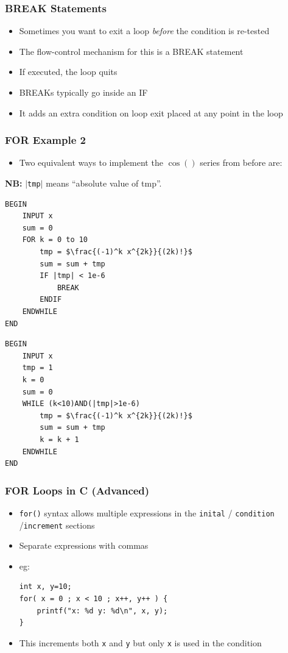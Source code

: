 \documentclass[14pt]{beamer}
\begin{document}
\begin{frame}
\frametitle{BREAK Statements}
\begin{itemize}
\item Sometimes you want to exit a loop \textit{before} the condition is re-tested
\item The flow-control mechanism for this is a BREAK statement
\item If executed, the loop quits
\item BREAKs typically go inside an IF
\item It adds an extra condition on loop exit placed at any point in the loop
\end{itemize}
\end{frame}

\begin{frame}[fragile]
\frametitle{FOR Example 2}
\begin{itemize}
\item Two equivalent ways to implement the $\cos()$ series from before are:
\end{itemize}
{\small\textbf{NB:} $|$\texttt{tmp}$|$ means ``absolute value of tmp''.}
\begin{multicols}{2}
\begin{lstlisting}[style=pseudo,mathescape=true,basicstyle=\ttfamily\scriptsize]
BEGIN
	INPUT x
	sum = 0
	FOR k = 0 to 10
		tmp = $\frac{(-1)^k x^{2k}}{(2k)!}$
		sum = sum + tmp
		IF |tmp| < 1e-6
			BREAK
		ENDIF
	ENDWHILE 
END
\end{lstlisting}
\columnbreak
\begin{lstlisting}[style=pseudo,mathescape=true,basicstyle=\ttfamily\scriptsize]
BEGIN
	INPUT x
	tmp = 1
	k = 0
	sum = 0
	WHILE (k<10)AND(|tmp|>1e-6)
		tmp = $\frac{(-1)^k x^{2k}}{(2k)!}$
		sum = sum + tmp
		k = k + 1
	ENDWHILE 
END
\end{lstlisting}

\end{multicols}
\end{frame}



\begin{frame}[fragile]
\frametitle{FOR Loops in C (Advanced)}
\begin{itemize}
\item \texttt{for()} syntax allows multiple expressions in the \texttt{inital} / \texttt{condition} /\texttt{increment} sections
\item Separate expressions with commas
\item eg:
\begin{lstlisting}[style=CStyle]
int x, y=10;
for( x = 0 ; x < 10 ; x++, y++ ) {
	printf("x: %d y: %d\n", x, y);
}
\end{lstlisting}
\item This increments both \texttt{x} and \texttt{y} but only \texttt{x} is used in the condition
\end{itemize}
\end{frame}
\end{document}
